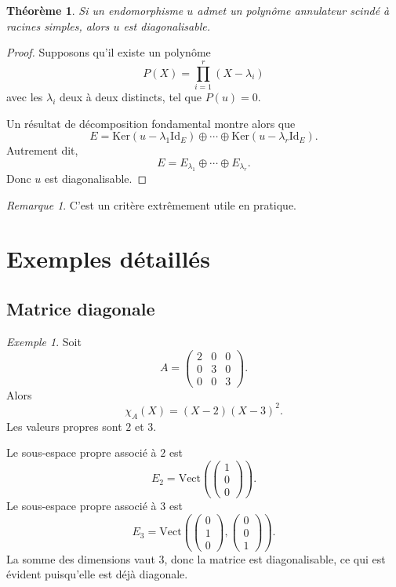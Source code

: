 \documentclass[11pt,a4paper]{article}
\newtheorem{theoreme}[definition]{Théorème}
\theoremstyle{remark}
\newtheorem{remarque}[definition]{Remarque}
\newtheorem{exemple}[definition]{Exemple}
\newcommand{\Vect}{\mathrm{Vect}}
\newcommand{\Ker}{\mathrm{Ker}}
\newcommand{\id}{\mathrm{Id}}
\newcommand{\chiA}{\chi_A}
\begin{document}
\begin{theoreme}
Si un endomorphisme \(u\) admet un polynôme annulateur scindé à racines simples, alors \(u\) est diagonalisable.
\end{theoreme}

\begin{proof}
Supposons qu’il existe un polynôme
\[
P(X)=\prod_{i=1}^r (X-\lambda_i)
\]
avec les \(\lambda_i\) deux à deux distincts, tel que \(P(u)=0\).

Un résultat de décomposition fondamental montre alors que
\[
E=\Ker(u-\lambda_1\id_E)\oplus\cdots\oplus \Ker(u-\lambda_r\id_E).
\]
Autrement dit,
\[
E=E_{\lambda_1}\oplus\cdots\oplus E_{\lambda_r}.
\]
Donc \(u\) est diagonalisable.
\end{proof}

\begin{remarque}
C’est un critère extrêmement utile en pratique.
\end{remarque}

\section{Exemples détaillés}

\subsection{Matrice diagonale}

\begin{exemple}
Soit
\[
A=
\begin{pmatrix}
2 & 0 & 0\\
0 & 3 & 0\\
0 & 0 & 3
\end{pmatrix}.
\]
Alors
\[
\chiA(X)=(X-2)(X-3)^2.
\]
Les valeurs propres sont \(2\) et \(3\).

Le sous-espace propre associé à \(2\) est
\[
E_2=\Vect\left(
\begin{pmatrix}
1\\0\\0
\end{pmatrix}
\right).
\]
Le sous-espace propre associé à \(3\) est
\[
E_3=\Vect\left(
\begin{pmatrix}
0\\1\\0
\end{pmatrix},
\begin{pmatrix}
0\\0\\1
\end{pmatrix}
\right).
\]
La somme des dimensions vaut \(3\), donc la matrice est diagonalisable, ce qui est évident puisqu’elle est déjà diagonale.
\end{exemple}
\end{document}
